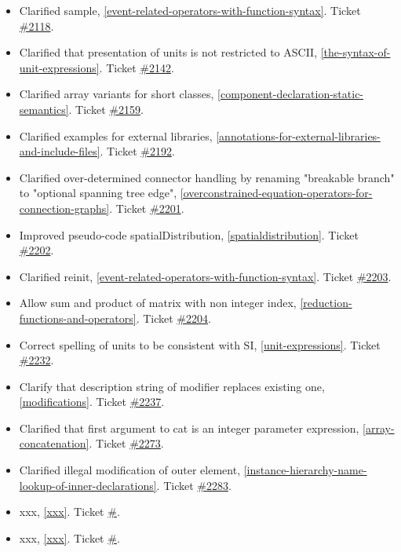 \begin{itemize}
\item Clarified sample, \cref{event-related-operators-with-function-syntax}.
Ticket \href{https://github.com/modelica/ModelicaSpecification/issues/2118}{\#2118}.
\item Clarified that presentation of units is not restricted to ASCII, \cref{the-syntax-of-unit-expressions}.
Ticket \href{https://github.com/modelica/ModelicaSpecification/issues/2142}{\#2142}.
\item Clarified array variants for short classes, \cref{component-declaration-static-semantics}.
Ticket \href{https://github.com/modelica/ModelicaSpecification/issues/2159}{\#2159}.
\item Clarified examples for external libraries, \cref{annotations-for-external-libraries-and-include-files}.
Ticket \href{https://github.com/modelica/ModelicaSpecification/issues/2192}{\#2192}.
\item Clarified over-determined connector handling by renaming "breakable branch" to "optional spanning tree edge", \cref{overconstrained-equation-operators-for-connection-graphs}.
Ticket \href{https://github.com/modelica/ModelicaSpecification/issues/2201}{\#2201}.
\item Improved pseudo-code spatialDistribution, \cref{spatialdistribution}.
Ticket \href{https://github.com/modelica/ModelicaSpecification/issues/2202}{\#2202}.
\item Clarified reinit, \cref{event-related-operators-with-function-syntax}.
Ticket \href{https://github.com/modelica/ModelicaSpecification/issues/2203}{\#2203}.
\item Allow sum and product of matrix with non integer index, \cref{reduction-functions-and-operators}.
Ticket \href{https://github.com/modelica/ModelicaSpecification/issues/2204}{\#2204}.
\item Correct spelling of units to be consistent with SI, \cref{unit-expressions}.
Ticket \href{https://github.com/modelica/ModelicaSpecification/issues/2232}{\#2232}.
\item Clarify that description string of modifier replaces existing one, \cref{modifications}.
Ticket \href{https://github.com/modelica/ModelicaSpecification/issues/2237}{\#2237}.
\item Clarified that first argument to cat is an integer parameter expression, \cref{array-concatenation}.
Ticket \href{https://github.com/modelica/ModelicaSpecification/issues/2273}{\#2273}.
\item Clarified illegal modification of outer element, \cref{instance-hierarchy-name-lookup-of-inner-declarations}.
Ticket \href{https://github.com/modelica/ModelicaSpecification/issues/2283}{\#2283}.

\item xxx, \cref{xxx}.
Ticket \href{https://github.com/modelica/ModelicaSpecification/issues/}{\#}.
\item xxx, \cref{xxx}.
Ticket \href{https://github.com/modelica/ModelicaSpecification/pull/}{\#}.
\fi
\end{itemize}

